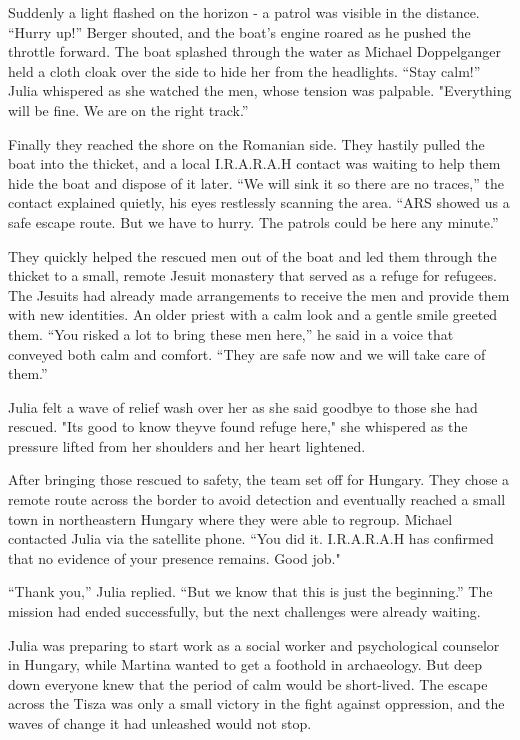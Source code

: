 \documentclass[
]{article}
\begin{document}
Suddenly a light flashed on the horizon - a patrol was visible in the
distance. ``Hurry up!'' Berger shouted, and the boat's engine roared as
he pushed the throttle forward. The boat splashed through the water as
Michael Doppelganger held a cloth cloak over the side to hide her from
the headlights. ``Stay calm!'' Julia whispered as she watched the men,
whose tension was palpable. "Everything will be fine. We are on the
right track.''

Finally they reached the shore on the Romanian side. They hastily pulled
the boat into the thicket, and a local I.R.A.R.A.H contact was waiting
to help them hide the boat and dispose of it later. ``We will sink it so
there are no traces,'' the contact explained quietly, his eyes
restlessly scanning the area. ``ARS showed us a safe escape route. But
we have to hurry. The patrols could be here any minute.''

They quickly helped the rescued men out of the boat and led them through
the thicket to a small, remote Jesuit monastery that served as a refuge
for refugees. The Jesuits had already made arrangements to receive the
men and provide them with new identities. An older priest with a calm
look and a gentle smile greeted them. ``You risked a lot to bring these
men here,'' he said in a voice that conveyed both calm and comfort.
``They are safe now and we will take care of them.''

Julia felt a wave of relief wash over her as she said goodbye to those
she had rescued. "It\textquotesingle s good to know
they\textquotesingle ve found refuge here," she whispered as the
pressure lifted from her shoulders and her heart lightened.

After bringing those rescued to safety, the team set off for Hungary.
They chose a remote route across the border to avoid detection and
eventually reached a small town in northeastern Hungary where they were
able to regroup. Michael contacted Julia via the satellite phone. ``You
did it. I.R.A.R.A.H has confirmed that no evidence of your presence
remains. Good job."

``Thank you,'' Julia replied. ``But we know that this is just the
beginning.'' The mission had ended successfully, but the next challenges
were already waiting.

Julia was preparing to start work as a social worker and psychological
counselor in Hungary, while Martina wanted to get a foothold in
archaeology. But deep down everyone knew that the period of calm would
be short-lived. The escape across the Tisza was only a small victory in
the fight against oppression, and the waves of change it had unleashed
would not stop.
\end{document}
